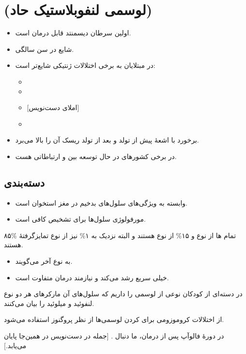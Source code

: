 \documentclass[12pt,a4paper]{article}
\begin{document}
\section*{ (لوسمی لنفوبلاستیک حاد)}
\begin{itemize}
\item اولین سرطان دیسمنتد قابل درمان است.
\item شایع در سن  سالگی.
\item در مبتلایان به برخی اختلالات ژنتیکی شایع‌تر است:
\begin{itemize}
\item {}
\item {}
\item {} [املای دست‌نویس]
\item {}
\end{itemize}
\item برخورد با اشعهٔ  پیش از تولد و بعد از تولد ریسک آن را بالا می‌برد.
\item در برخی کشورهای در حال توسعه بین  و  ارتباطاتی هست.
\end{itemize}
\subsection*{دسته‌بندی }
\begin{itemize}
\item وابسته به ویژگی‌های سلول‌های بدخیم در مغز استخوان است.
\item مورفولوژی سلول‌ها برای تشخیص  کافی است.
\end{itemize}

۸۵\% تمام ها از نوع  و ۱۵\% از نوع  هستند و البته نزدیک به ۱\% نیز از نوع تمایزگرفتهٔ  هستند.
\begin{itemize}
\item به نوع آخر  می‌گویند.
\item خیلی سریع رشد می‌کند و نیازمند درمان متفاوت است.
\end{itemize}
در دسته‌ای از کودکان نوعی از لوسمی را داریم که سلول‌های آن مارکرهای هر دو نوع لنفوئید و میلوئید را بیان می‌کنند.

از اختلالات کروموزومی برای  کردن لوسمی‌ها از نظر پروگنوز استفاده می‌شود.

در دورهٔ فالوآپ پس از درمان، ما دنبال . [جمله در دست‌نویس در همین‌جا پایان می‌یابد.]
\end{document}
